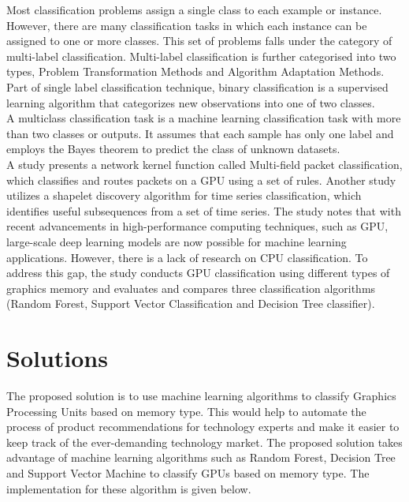 \documentclass[conference]{IEEEtran}
\begin{document}
	Most classification problems assign a single class to each example or instance\cite{b1}. However, there are many classification tasks in which each instance can be assigned to one or more classes. This set of problems falls under the category of multi-label classification\cite{C10}. Multi-label classification is further categorised into two types, Problem Transformation Methods and  Algorithm Adaptation Methods.\\ 
	
	Part of single label classification technique, binary classification is a supervised learning algorithm that categorizes new observations into one of two classes\cite{C13}. \\
	A multiclass classification task is a machine learning classification task with more than two classes or outputs\cite{C14}. It assumes that each sample has only one label and employs the Bayes theorem to predict the class of unknown datasets\cite{C14}.\\	
	
	A study presents a network kernel function called Multi-field packet classification, which classifies and routes packets on a GPU using a set of rules\cite{C15}. Another study utilizes a shapelet discovery algorithm for time series classification, which identifies useful subsequences from a set of time series\cite{C16}. The study notes that with recent advancements in high-performance computing techniques, such as GPU, large-scale deep learning models are now possible for machine learning applications\cite{C17}. However, there is a lack of research on CPU classification. To address this gap, the study conducts GPU classification using different types of graphics memory and evaluates and compares three classification algorithms (Random Forest, Support Vector Classification and Decision Tree classifier).
	
\section{Solutions}
	The proposed solution is to use machine learning algorithms to classify Graphics Processing Units based on memory type. This would help to automate the process of product recommendations for technology experts and make it easier to keep track of the ever-demanding technology market. The proposed solution takes advantage of machine learning algorithms such as Random Forest, Decision Tree and Support Vector Machine to classify GPUs based on memory type. The implementation for these algorithm is given below.
\end{document}
